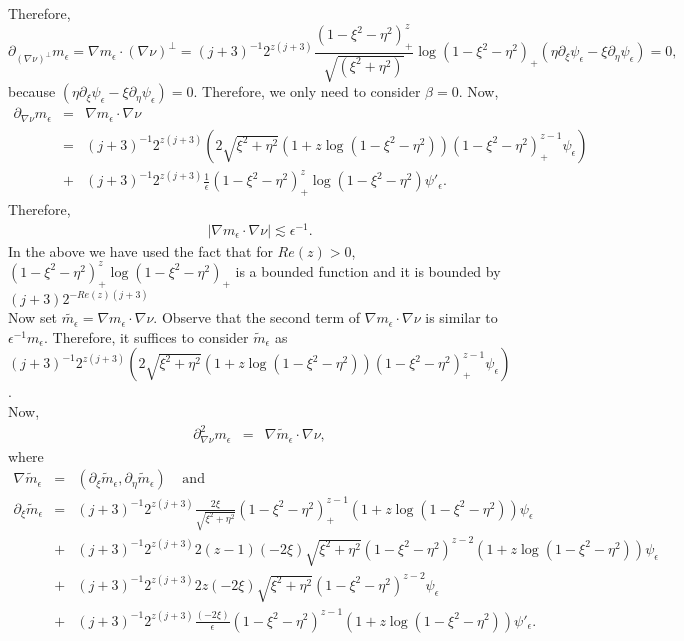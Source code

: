 \documentclass[a4paper,12pt]{amsart}
\begin{document}
Therefore, $$\partial_{(\nabla \nu)^{\perp}} m_{\epsilon}=\nabla m_{\epsilon}\cdot (\nabla\nu)^{\perp}=(j+3)^{-1}2^{z(j+3)}\frac{(1-\xi^{2}-\eta^{2})^{z}_{+}}{\sqrt{(\xi^{2}+\eta^{2})}}\log(1-\xi^{2}-\eta^{2})_{+}\left(\eta \partial_{\xi} \psi_{\epsilon}-\xi \partial_{\eta} \psi_{\epsilon}\right)=0,$$
because $\left(\eta \partial_{\xi} \psi_{\epsilon}-\xi \partial_{\eta} \psi_{\epsilon}\right)=0$. Therefore, we only need to consider $\beta=0$. Now,
\begin{eqnarray*}
\partial_{\nabla\nu} m_{\epsilon}&=&\nabla m_{\epsilon}\cdot\nabla\nu\\
	&=&(j+3)^{-1}2^{z(j+3)}\left(2\sqrt{\xi^{2}+\eta^{2}}(1+z\log(1-\xi^{2}-\eta^{2}))(1-\xi^{2}-\eta^{2})^{z-1}_{+}\psi_{\epsilon}\right)\\ &+&(j+3)^{-1}2^{z(j+3)}\frac{1}{\epsilon}(1-\xi^{2}-\eta^{2})^{z}_{+}\log(1-\xi^{2}-\eta^{2})\psi'_{\epsilon}.
\end{eqnarray*} 
Therefore, 
\begin{eqnarray}
|\nabla m_{\epsilon}\cdot\nabla\nu|\lesssim \epsilon^{-1}.
\end{eqnarray} 
In the above we have used the fact that for  $Re(z)>0$, $(1-\xi^{2}-\eta^{2})^{z}_{+}\log(1-\xi^{2}-\eta^{2})_{+}$ is a bounded function and it is bounded by $(j+3)2^{-Re(z)(j+3)}$ \\
Now set  $\tilde{m_{\epsilon}}=\nabla m_{\epsilon}\cdot\nabla\nu$. Observe that the second term of $\nabla m_{\epsilon}\cdot\nabla\nu$ is similar to $\epsilon^{-1}m_{\epsilon}$. Therefore, it suffices to consider $\tilde{m}_{\epsilon}$ as\\  $(j+3)^{-1}2^{z(j+3)}\left(2\sqrt{\xi^{2}+\eta^{2}}(1+z\log(1-\xi^{2}-\eta^{2}))(1-\xi^{2}-\eta^{2})^{z-1}_{+}\psi_{\epsilon}\right)$.\\  Now,
\begin{eqnarray*}
	\partial^{2}_{\nabla\nu} {m}_{\epsilon}&=&\nabla\tilde{m}_{\epsilon}\cdot \nabla\nu,
\end{eqnarray*}
where 
\begin{eqnarray*}
	\nabla\tilde{m}_{\epsilon}&=&(\partial_{\xi} \tilde{m}_{\epsilon},
	\partial_{\eta} \tilde{m}_{\epsilon})~~~~~\text{and}\\
	\partial_{\xi} \tilde{m}_{\epsilon}&=&(j+3)^{-1}2^{z(j+3)}\frac{2\xi}{\sqrt{\xi^{2}+\eta^{2}}}(1-\xi^{2}-\eta^{2})_{+}^{z-1}(1+z\log(1-\xi^{2}-\eta^{2}))\psi_{\epsilon}\\ &+&(j+3)^{-1}2^{z(j+3)}2(z-1)(-2\xi)\sqrt{\xi^{2}+\eta^{2}}(1-\xi^{2}-\eta^{2})^{z-2}(1+z\log(1-\xi^{2}-\eta^{2}))\psi_{\epsilon}\\
	&+&(j+3)^{-1}2^{z(j+3)}2z(-2\xi)\sqrt{\xi^{2}+\eta^{2}} (1-\xi^{2}-\eta^{2})^{z-2}\psi_{\epsilon}\\
	&+&(j+3)^{-1}2^{z(j+3)}\frac{(-2\xi)}{\epsilon}(1-\xi^{2}-\eta^{2})^{z-1}(1+z\log(1-\xi^{2}-\eta^{2}))\psi'_{\epsilon}.
\end{eqnarray*}
\end{document}
